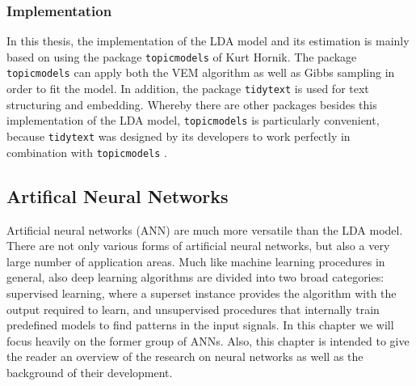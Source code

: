 \documentclass[11pt,a4paper]{article}
\begin{document}
\subsubsection{Implementation}

In this thesis, the implementation of the LDA model and its estimation is mainly based on using the package \texttt{topicmodels} of Kurt Hornik. The package \texttt{topicmodels} can apply both the VEM algorithm as well as Gibbs sampling in order to fit the model. In addition, the package \texttt{tidytext} is used for text structuring and embedding. Whereby there are other packages besides this implementation of the LDA model, \texttt{topicmodels} is particularly convenient, because \texttt{tidytext} was designed by its developers to work perfectly in combination with \texttt{topicmodels} \cite[p. 89]{Silge2017}.


\subsection{Artifical Neural Networks} \label{ANN_chapter}

Artificial neural networks (ANN) are much more versatile than the LDA model. There are not only various forms of artificial neural networks, but also a very large number of application areas. Much like machine learning procedures in general, also deep learning algorithms are divided into two broad categories: supervised learning, where a superset instance provides the algorithm with the output required to learn, and unsupervised procedures that internally train predefined models to find patterns in the input signals. In this chapter we will focus heavily on the former group of ANNs. Also, this chapter is intended to give the reader an overview of the research on neural networks as well as the background of their development. \\
\end{document}
